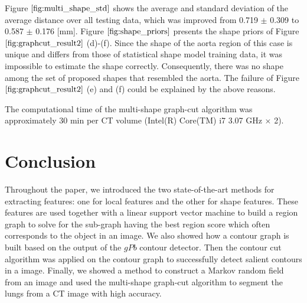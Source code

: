 \documentclass{SMBV12}
\begin{document}
Figure $\ref{fig:multi_shape_std}$ shows the average and standard deviation of the average distance over all testing data, which was improved from 0.719 $\pm$ 0.309 to 0.587 $\pm$ 0.176 [mm]. Figure $\ref{fig:shape_priors}$ presents the shape priors of Figure $\ref{fig:graphcut_result2}$ (d)-(f). Since the shape of the aorta region of this case is unique and differs from those of statistical shape model training data, it was impossible to estimate the shape correctly. Consequently, there was no shape among the set of proposed shapes that resembled the aorta. The failure of Figure $\ref{fig:graphcut_result2}$ (e) and (f) could be explained by the above reasons.

The computational time of the multi-shape graph-cut algorithm was approximately 30 min per CT volume (Intel(R) Core(TM) i7 3.07 GHz $\times$ 2).

\section{Conclusion}
\label{sec:conclusion}

Throughout the paper, we introduced the two state-of-the-art methods for extracting features: one for local features and the other for shape features. These features are used together with a linear support vector machine to build a region graph to solve for the sub-graph having the best region score which often corresponds to the object in an image. We also showed how a contour graph is built based on the output of the $gPb$ contour detector. Then the contour cut algorithm was applied on the contour graph to successfully detect salient contours in a image. Finally, we showed a method to construct a Markov random field from an image and used the multi-shape graph-cut algorithm to segment the lungs from a CT image with high accuracy. 
\end{document}
